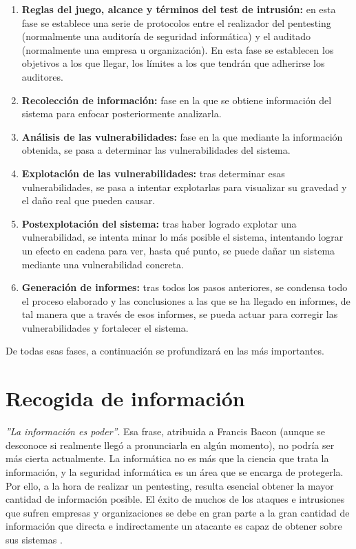 \begin{enumerate}
	\item \textbf{Reglas del juego, alcance y términos del test de intrusión:} en esta fase se establece una serie de protocolos entre el realizador del pentesting (normalmente una auditoría de seguridad informática) y el auditado (normalmente una empresa u organización). En esta fase se establecen los objetivos a los que llegar, los límites a los que tendrán que adherirse los auditores.
	\item \textbf{Recolección de información:} fase en la que se obtiene información del sistema para enfocar posteriormente analizarla.
	\item \textbf{Análisis de las vulnerabilidades:} fase en la que mediante la información obtenida, se pasa a determinar las vulnerabilidades del sistema.
	\item \textbf{Explotación de las vulnerabilidades:} tras determinar esas vulnerabilidades, se pasa a intentar explotarlas para visualizar su gravedad y el daño real que pueden causar.
	\item \textbf{Postexplotación del sistema:} tras haber logrado explotar una vulnerabilidad, se intenta minar lo más posible el sistema, intentando lograr un efecto en cadena para ver, hasta qué punto, se puede dañar un sistema mediante una vulnerabilidad concreta.
	\item \textbf{Generación de informes:} tras todos los pasos anteriores, se condensa todo el proceso elaborado y las conclusiones a las que se ha llegado en informes, de tal manera que a través de esos informes, se pueda actuar para corregir las vulnerabilidades y fortalecer el sistema.
\end{enumerate}

De todas esas fases, a continuación se profundizará en las más importantes.

\section{Recogida de información}

\textit{''La información es poder''}. Esa frase, atribuida a Francis Bacon (aunque se desconoce si realmente llegó a pronunciarla en algún momento), no podría ser más cierta actualmente. La informática no es más que la ciencia que trata la información, y la seguridad informática es un área que se encarga de protegerla. Por ello, a la hora de realizar un pentesting, resulta esencial obtener la mayor cantidad de información posible. El éxito de muchos de los ataques e intrusiones que sufren empresas y organizaciones se debe en gran parte a la gran cantidad de información que directa e indirectamente un atacante es capaz de obtener sobre sus sistemas \cite{inteco-gathering}.

